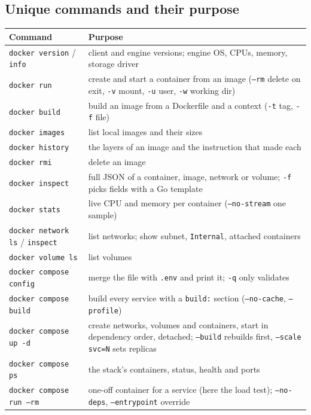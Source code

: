 \documentclass[11pt,a4paper]{article}
\begin{document}
\subsection{Unique commands and their purpose}
\begin{table}[H]
\small
\begin{tabularx}{\linewidth}{@{}lL@{}}
\toprule
Command & Purpose \\
\midrule
\texttt{docker version} / \texttt{info} & client and engine versions; engine OS, CPUs, memory, storage driver \\
\texttt{docker run} & create and start a container from an image (\texttt{--rm} delete on exit, \texttt{-v} mount, \texttt{-u} user, \texttt{-w} working dir) \\
\texttt{docker build} & build an image from a Dockerfile and a context (\texttt{-t} tag, \texttt{-f} file) \\
\texttt{docker images} & list local images and their sizes \\
\texttt{docker history} & the layers of an image and the instruction that made each \\
\texttt{docker rmi} & delete an image \\
\texttt{docker inspect} & full JSON of a container, image, network or volume; \texttt{-f} picks fields with a Go template \\
\texttt{docker stats} & live CPU and memory per container (\texttt{--no-stream} one sample) \\
\texttt{docker network ls} / \texttt{inspect} & list networks; show subnet, \texttt{Internal}, attached containers \\
\texttt{docker volume ls} & list volumes \\
\midrule
\texttt{docker compose config} & merge the file with \texttt{.env} and print it; \texttt{-q} only validates \\
\texttt{docker compose build} & build every service with a \texttt{build:} section (\texttt{--no-cache}, \texttt{--profile}) \\
\texttt{docker compose up -d} & create networks, volumes and containers, start in dependency order, detached; \texttt{--build} rebuilds first, \texttt{--scale svc=N} sets replicas \\
\texttt{docker compose ps} & the stack's containers, status, health and ports \\
\texttt{docker compose run --rm} & one-off container for a service (here the load test); \texttt{--no-deps}, \texttt{--entrypoint} override \\

\end{tabularx}
\end{table}
\end{document}
